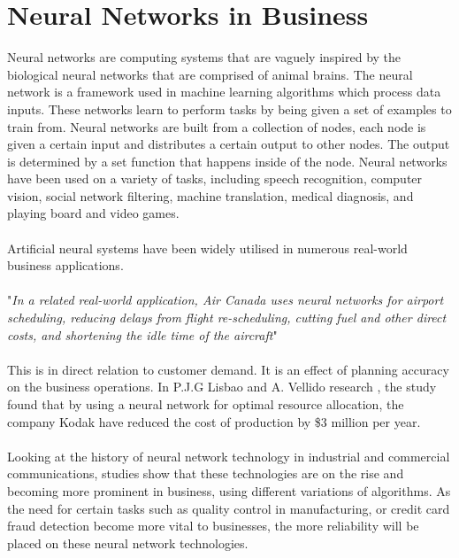 \documentclass{article}
\begin{document}
\section{Neural Networks in Business}
Neural networks are computing systems that are vaguely inspired by the biological neural networks that are comprised of animal brains. The neural network is a framework used in machine learning algorithms which process data inputs. These networks learn to perform tasks by being given a set of examples to train from. Neural networks are built from a collection of nodes, each node is given a certain input and distributes a certain output to other nodes. The output is determined by a set function that happens inside of the node.\cite{144047820160101} Neural networks have been used on a variety of tasks, including speech recognition, computer vision, social network filtering, machine translation, medical diagnosis, and playing board and video games.\cite{murphy2010tu}
\\\\
Artificial neural systems have been widely utilised in numerous real-world business applications.\\\\
    "\textit{In a related real-world application, Air Canada uses neural networks for airport scheduling, reducing delays from flight re-scheduling, cutting fuel and other direct costs, and shortening the idle time of the aircraft}"\cite{51409020000101}\\\\
This is in direct relation to customer demand. It is an effect of planning accuracy on the business operations. In P.J.G Lisbao and A. Vellido research \cite{51409020000101}, the study found that by using a neural network for optimal resource allocation, the company Kodak have reduced the cost of production by \$3 million per year.
\\\\
Looking at the history of neural network technology in industrial and commercial communications,  studies show that these technologies are on the rise and becoming more prominent in business, using different variations of algorithms.\cite{widrow1994neural} As the need for certain tasks such as quality control in manufacturing, or credit card fraud detection become more vital to businesses, the more reliability will be placed on these neural network technologies.
\\\\
\end{document}

